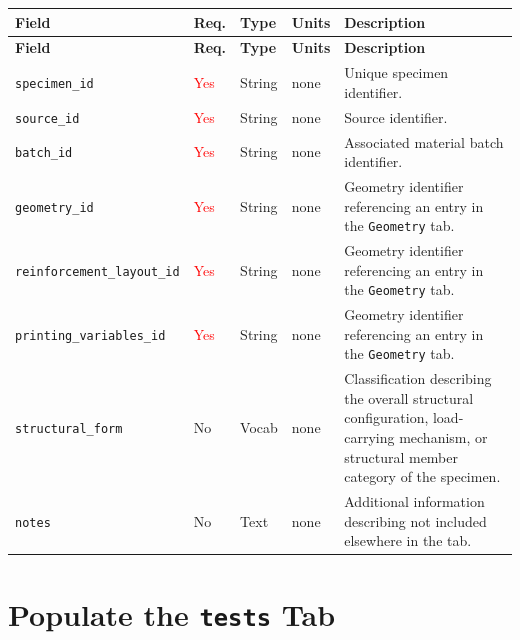 \documentclass[11pt]{book}
\begin{document}
\begin{longtable}{>{\raggedright\arraybackslash}p{}
                  >{\raggedright\arraybackslash}p{}
                  >{\raggedright\arraybackslash}p{}
                  >{\raggedright\arraybackslash}p{}
                  >{\raggedright\arraybackslash}p{}}
\hline
\textbf{Field} &
\textbf{Req.} &
\textbf{Type} &
\textbf{Units} &
\textbf{Description} \\
\hline
\endfirsthead

\hline
\textbf{Field} &
\textbf{Req.} &
\textbf{Type} &
\textbf{Units} &
\textbf{Description} \\
\hline
\endhead

\texttt{specimen\_id} & \textcolor{red}{Yes} & String & none & Unique specimen identifier. \\

\texttt{source\_id} & \textcolor{red}{Yes} & String & none & Source identifier. \\

\texttt{batch\_id} & \textcolor{red}{Yes} & String & none & Associated material batch identifier. \\

\texttt{geometry\_id} & \textcolor{red}{Yes} & String & none & Geometry identifier referencing an entry in the \texttt{Geometry} tab. \\

\texttt{reinforcement\_layout\_id} & \textcolor{red}{Yes} & String & none & Geometry identifier referencing an entry in the \texttt{Geometry} tab. \\

\texttt{printing\_variables\_id} & \textcolor{red}{Yes} & String & none & Geometry identifier referencing an entry in the \texttt{Geometry} tab. \\

\texttt{structural\_form} & No & Vocab & none &
Classification describing the overall structural configuration, load-carrying mechanism, or structural member category of the specimen. \\

\texttt{notes} & No & Text & none & Additional information describing not included elsewhere in the tab. \\

\hline
\end{longtable}



\section{Populate the \texttt{tests} Tab}
\end{document}
